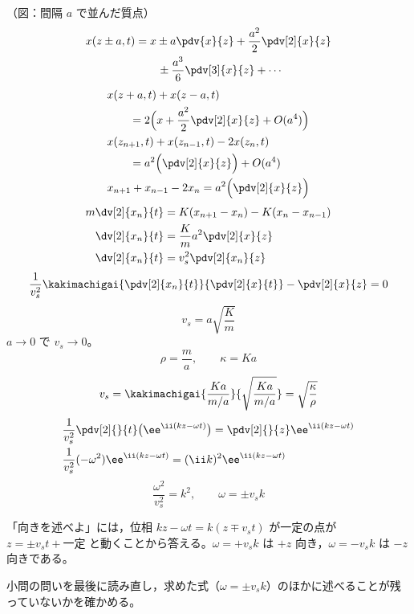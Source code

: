 （図：間隔 $a$ で並んだ質点）
\begin{align*}
  x(z\pm a,t)&=x\pm a\pdv{x}{z}+\frac{a^{2}}{2}\pdv[2]{x}{z}\\
  &\qquad\pm\frac{a^{3}}{6}\pdv[3]{x}{z}+\cdots
\end{align*}
\begin{align*}
  &x(z+a,t)+x(z-a,t)\\
  &\qquad=2\Bigl(x+\frac{a^{2}}{2}\pdv[2]{x}{z}+O(a^{4})\Bigr)\\
  &x(z_{n+1},t)+x(z_{n-1},t)-2x(z_n,t)\\
  &\qquad=a^{2}\Bigl(\pdv[2]{x}{z}\Bigr)+O(a^{4})\\
  &x_{n+1}+x_{n-1}-2x_n=a^{2}\Bigl(\pdv[2]{x}{z}\Bigr)
\end{align*}
\begin{align*}
  m\dv[2]{x_n}{t}&=K(x_{n+1}-x_n)-K(x_n-x_{n-1})\\
  \dv[2]{x_n}{t}&=\frac{K}{m}a^{2}\pdv[2]{x}{z}\\
  \dv[2]{x_n}{t}&=v_s^{2}\pdv[2]{x_n}{z}
\end{align*}
\[ \frac{1}{v_s^{2}}\kakimachigai{\pdv[2]{x_n}{t}}{\pdv[2]{x}{t}}-\pdv[2]{x}{z}=0 \]
\[ v_s=a\sqrt{\frac{K}{m}} \]
$a\to0$ で $v_s\to0$。
\[ \rho=\frac{m}{a},\qquad\kappa=Ka \]
\[ v_s=\kakimachigai{\frac{Ka}{m/a}}{\sqrt{\frac{Ka}{m/a}}}=\sqrt{\frac{\kappa}{\rho}} \]
\begin{align*}
  &\frac{1}{v_s^{2}}\pdv[2]{}{t}\bigl(\ee^{\ii(kz-\omega t)}\bigr)=\pdv[2]{}{z}\ee^{\ii(kz-\omega t)}\\
  &\frac{1}{v_s^{2}}(-\omega^{2})\ee^{\ii(kz-\omega t)}=(\ii k)^{2}\ee^{\ii(kz-\omega t)}
\end{align*}
\[ \frac{\omega^{2}}{v_s^{2}}=k^{2},\qquad\omega=\pm v_sk \]
\item 「向きを述べよ」には，位相 $kz-\omega t=k(z\mp v_st)$ が一定の点が $z=\pm v_st+\text{一定}$ と動くことから答える。$\omega=+v_sk$ は $+z$ 向き，$\omega=-v_sk$ は $-z$ 向きである。
\item 小問の問いを最後に読み直し，求めた式（$\omega=\pm v_sk$）のほかに述べることが残っていないかを確かめる。

